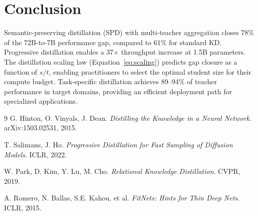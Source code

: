 \documentclass[11pt,a4paper]{article}
\begin{document}
\section{Conclusion}
\label{sec:conclusion}

Semantic-preserving distillation (SPD) with multi-teacher aggregation closes 78\% of
the 72B-to-7B performance gap, compared to 61\% for standard KD. Progressive distillation
enables a 37$\times$ throughput increase at 1.5B parameters. The distillation scaling
law (Equation~\ref{eq:scaling}) predicts gap closure as a function of $s/t$, enabling
practitioners to select the optimal student size for their compute budget. Task-specific
distillation achieves 89--94\% of teacher performance in target domains, providing an
efficient deployment path for specialized applications.

\begin{thebibliography}{9}
G. Hinton, O. Vinyals, J. Dean.
\textit{Distilling the Knowledge in a Neural Network}.
arXiv:1503.02531, 2015.

T. Salimans, J. Ho.
\textit{Progressive Distillation for Fast Sampling of Diffusion Models}.
ICLR, 2022.

W. Park, D. Kim, Y. Lu, M. Cho.
\textit{Relational Knowledge Distillation}.
CVPR, 2019.

A. Romero, N. Ballas, S.E. Kahou, et al.
\textit{FitNets: Hints for Thin Deep Nets}.
ICLR, 2015.
\end{thebibliography}
\end{document}
